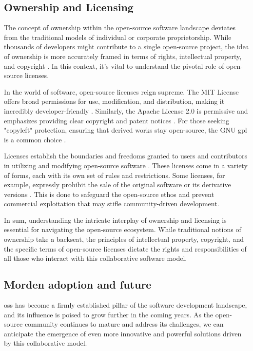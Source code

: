 \subsection{Ownership and Licensing}

The concept of ownership within the open-source software landscape deviates from the traditional models of individual or corporate proprietorship. While thousands of developers might contribute to a single open-source project, the idea of ownership is more accurately framed in terms of rights, intellectual property, and copyright \cite{Codeownership}.  In this context, it's vital to understand the pivotal role of open-source licenses.

In the world of software, open-source licenses reign supreme. The MIT License offers broad permissions for use, modification, and distribution, making it incredibly developer-friendly \cite{saltzer2020origin}. Similarly, the Apache License 2.0 is permissive and emphasizes providing clear copyright and patent notices \cite{sinclair2010license}. For those seeking "copyleft" protection, ensuring that derived works stay open-source, the GNU \ac{gpl} is a common choice \cite{license1989gnu}.

Licenses establish the boundaries and freedoms granted to users and contributors in utilizing and modifying open-source software \cite{laurent2004understanding}. These licenses come in a variety of forms, each with its own set of rules and restrictions. Some licenses, for example, expressly prohibit the sale of the original software or its derivative versions \cite{madison2003reconstructing}. This is done to safeguard the open-source ethos and prevent commercial exploitation that may stifle community-driven development.

In sum, understanding the intricate interplay of ownership and licensing is essential for navigating the open-source ecosystem. While traditional notions of ownership take a backseat, the principles of intellectual property, copyright, and the specific terms of open-source licenses dictate the rights and responsibilities of all those who interact with this collaborative software model.


\subsection{Morden adoption and future}
\ac{oss} has become a firmly established pillar of the software development landscape, and its influence is poised to grow further in the coming years.  As the open-source community continues to mature and address its challenges, we can anticipate the emergence of even more innovative and powerful solutions driven by this collaborative model.

